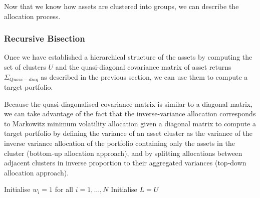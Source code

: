         Now that we know how assets are clustered into groups, we can describe the allocation process.
        
    \subsubsection{Recursive Bisection}
        Once we have established a hierarchical structure of the assets by computing the set of clusters $U$ and the quasi-diagonal covariance matrix of asset returns $\Sigma_{Quasi-diag}$ as described in the previous section, we can use them to compute a target portfolio.
        
        Because the quasi-diagonalised covariance matrix is similar to a diagonal matrix, we can take advantage of the fact that the inverse-variance allocation corresponds to Markowitz minimum volatility allocation given a diagonal matrix to compute a target portfolio by defining the variance of an asset cluster as the variance of the inverse variance allocation of the portfolio containing only the assets in the cluster (bottom-up allocation approach), and by splitting allocations between adjacent clusters in inverse proportion to their aggregated variances (top-down allocation approach).
        
        \begin{algorithm}[H]\label{algorithm:hrp}
            \SetAlgoLined
            
            Initialise $w_i = 1$ for all $i=1, \dots, N$\;
            Initialise $L = U$\;
            
            \caption{Recursive Bisection}
        \end{algorithm}
        ~\
        
